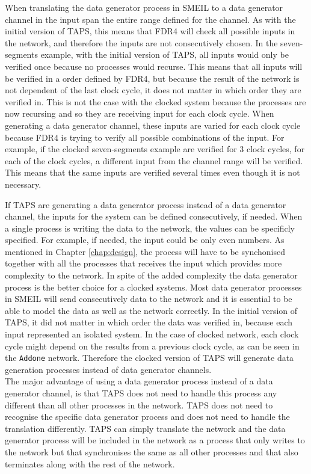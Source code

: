 When translating the data generator process in SMEIL to a data generator channel in \cspm{} the input span the entire range defined for the channel. As with the initial version of TAPS, this means that FDR4 will check all possible inputs in the network, and therefore the inputs are not consecutively chosen. In the seven-segments example, with the initial version of TAPS, all inputs would only be verified once because no processes would recurse.
This means that all inputs will be verified in a order defined by FDR4, but because the result of the network is not dependent of the last clock cycle, it does not matter in which order they are verified in. This is not the case with the clocked system because the processes are now recursing and so they are receiving input for each clock cycle. When generating a data generator channel, these inputs are varied for each clock cycle because FDR4 is trying to verify all possible combinations of the input.
For example, if the clocked seven-segments example are verified for 3 clock cycles, for each of the clock cycles, a different input from the channel range will be verified. This means that the same inputs are verified several times even though it is not necessary.

If TAPS are generating a data generator process instead of a data generator channel, the inputs for the system can be defined consecutively, if needed. When a single process is writing the data to the network, the values can be specificly specified. For example, if needed, the input could be only even numbers.
As mentioned in Chapter \ref{chap:design}, the process will have to be synchonised together with all the processes that receives the input which provides more complexity to the network. In spite of the added complexity the data generator process is the better choice for a clocked systems.
Most data generator processes in SMEIL will send consecutively data to the network and it is essential to be able to model the data as well as the network correctly. In the initial version of TAPS, it did not matter in which order the data was verified in, because each input represented an isolated system. In the case of clocked network, each clock cycle might depend on the results from a previous clock cycle, as can be seen in the \texttt{Addone} network. Therefore the clocked version of TAPS will generate data generation processes instead of data generator channels.\\

The major advantage of using a data generator process instead of a data generator channel, is that TAPS does not need to handle this process any different than all other processes in the network. TAPS does not need to recognise the specific data generator process and does not need to handle the translation differently. TAPS can simply translate the network and the data generator process will be included in the network as a process that only writes to the network but that synchronises the same as all other processes and that also terminates along with the rest of the network. \\

